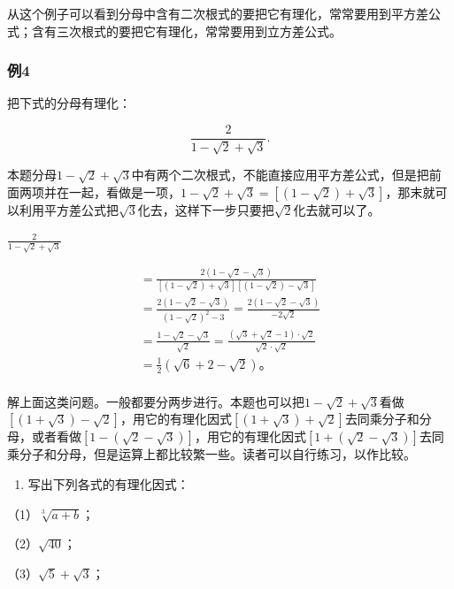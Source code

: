 从这个例子可以看到分母中含有二次根式的要把它有理化，常常要用到平方差公式；含有三次根式的要把它有理化，常常要用到立方差公式。

\subsubsection{例4}

把下式的分母有理化：

\[
\frac{2}{1 - \sqrt {2} + \sqrt {3}}.
\]

本题分母\(1 - \sqrt{2} + \sqrt{3}\)中有两个二次根式，不能直接应用平方差公式，但是把前面两项并在一起，看做是一项，\(1 - \sqrt{2} + \sqrt{3} = [(1 - \sqrt{2}) + \sqrt{3}]\)，那末就可以利用平方差公式把\(\sqrt{3}\)化去，这样下一步只要把\(\sqrt{2}\)化去就可以了。

 \(\frac{2}{1 - \sqrt{2} + \sqrt{3}}\)


\[
\begin{array}{l} = \frac{2 (1 - \sqrt {2} - \sqrt {3})}{[ (1 - \sqrt {2}) + \sqrt {3} ] [ (1 - \sqrt {2}) - \sqrt {3} ]} \\ = \frac{2 (1 - \sqrt {2} - \sqrt {3})}{(1 - \sqrt {2}) ^ {2} - 3} = \frac{2 (1 - \sqrt {2} - \sqrt {3})}{- 2 \sqrt {2}} \\ = \frac{1 - \sqrt {2} - \sqrt {3}}{\sqrt {2}} = \frac{(\sqrt {3} + \sqrt {2} - 1) \cdot \sqrt {2}}{\sqrt {2} \cdot \sqrt {2}} \\ = \frac{1}{2} (\sqrt {6} + 2 - \sqrt {2})\text{。} \\ \end{array}
\]


解上面这类问题。一般都要分两步进行。本题也可以把\(1 - \sqrt{2} + \sqrt{3}\)看做\([(1 + \sqrt{3}) - \sqrt{2}]\)，用它的有理化因式\([(1 + \sqrt{3}) + \sqrt{2}]\)去同乘分子和分母，或者看做\([1 - (\sqrt{2} - \sqrt{3})]\)，用它的有理化因式\([1 + (\sqrt{2} - \sqrt{3})]\)去同乘分子和分母，但是运算上都比较繁一些。读者可以自行练习，以作比较。

\begin{enumerate}
\item
  写出下列各式的有理化因式：
\end{enumerate}

（1）\(\sqrt[3]{a + b}\)；

（2）\(\sqrt{40}\)；

（3）\(\sqrt{5} + \sqrt{3}\)；

